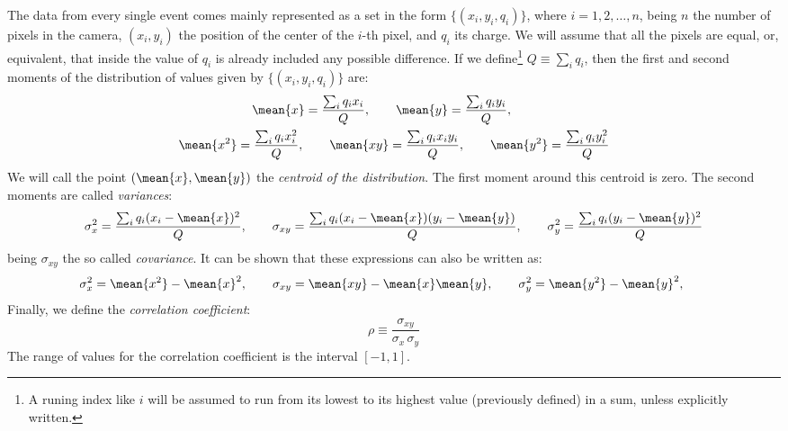 The data from every single event comes mainly represented as a set in
the form $\{(x_i, y_i, q_i)\}$, where $i=1,2,\ldots,n$, being $n$ the
number of pixels in the camera, $(x_i, y_i)$ the position of the
center of the $i$-th pixel, and $q_i$ its charge. We will assume that
all the pixels are equal, or, equivalent, that inside the value of
$q_i$ is already included any possible difference. If we
define\footnote{A runing index like $i$ will be assumed to run from
  its lowest to its highest value (previously defined) in a sum,
  unless explicitly written.} $Q\equiv\sum_i q_i$, then the first and
second moments of the distribution of values given by $\{(x_i,
y_i, q_i)\}$ are:
%
\begin{gather}
  \label{eq:defmeans}
  \mean{x} = \frac{\sum_i q_i x_i}{Q}, \qquad
  \mean{y} = \frac{\sum_i q_i y_i}{Q}, \qquad
  \\
  \label{eq:defmeans2}
  \mean{x^2} = \frac{\sum_i q_i x_i^2}{Q}, \qquad
  \mean{xy} = \frac{\sum_i q_i x_i y_i}{Q}, \qquad
  \mean{y^2} = \frac{\sum_i q_i y_i^2}{Q}
\end{gather}
%
We will call the point $(\mean{x},\mean{y})$ the \emph{centroid of the
  distribution}. The first moment around this centroid is zero. The
second moments are called \emph{variances}:
%
\begin{equation}
  \label{eq:defvar}
  \sigma_x^2  = \frac{\sum_i q_i (x_i - \mean{x})^2}{Q}, \qquad
  \sigma_{xy} = \frac{\sum_i q_i 
    (x_i - \mean{x})(y_i - \mean{y})}{Q}, \qquad
  \sigma_y^2  = \frac{\sum_i q_i (y_i - \mean{y})^2}{Q}
\end{equation}
%
being $\sigma_{xy}$ the so called \emph{covariance}. It can be shown
that these expressions can also be written as:
%
\begin{equation}
  \label{eq:defvarbis}
  \sigma_x^2  = \mean{x^2} - \mean{x}^2, \qquad 
  \sigma_{xy}  = \mean{xy} - \mean{x}\mean{y}, \qquad 
  \sigma_y^2  = \mean{y^2} - \mean{y}^2, \qquad 
\end{equation}
%
Finally, we define the \emph{correlation coefficient}:
\begin{equation}
  \label{eq:corr}
  \rho\equiv\frac{\sigma_{xy}}{\sigma_x\, \sigma_y}
\end{equation}
%
The range of values for the correlation coefficient is the interval
$[-1,1]$.

